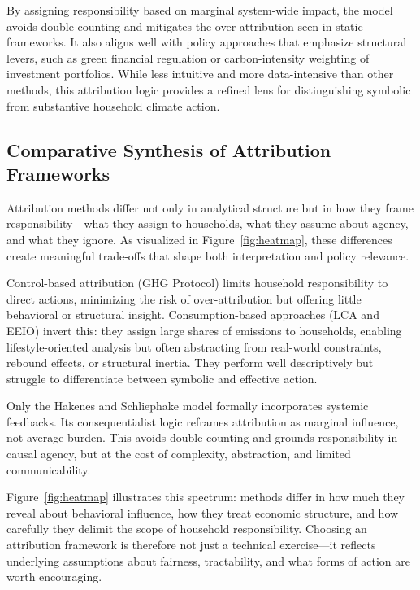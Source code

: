 \documentclass[12pt,a4paper]{article}%
\begin{document}
By assigning responsibility based on marginal system-wide impact, the model avoids double-counting and mitigates the over-attribution seen in static frameworks. It also aligns well with policy approaches that emphasize structural levers, such as green financial regulation or carbon-intensity weighting of investment portfolios. While less intuitive and more data-intensive than other methods, this attribution logic provides a refined lens for distinguishing symbolic from substantive household climate action.

\subsection{Comparative Synthesis of Attribution Frameworks}

Attribution methods differ not only in analytical structure but in how they frame responsibility—what they assign to households, what they assume about agency, and what they ignore. As visualized in Figure~\ref{fig:heatmap}, these differences create meaningful trade-offs that shape both interpretation and policy relevance.

Control-based attribution (GHG Protocol) limits household responsibility to direct actions, minimizing the risk of over-attribution but offering little behavioral or structural insight. Consumption-based approaches (LCA and EEIO) invert this: they assign large shares of emissions to households, enabling lifestyle-oriented analysis but often abstracting from real-world constraints, rebound effects, or structural inertia. They perform well descriptively but struggle to differentiate between symbolic and effective action.

Only the Hakenes and Schliephake model formally incorporates systemic feedbacks. Its consequentialist logic reframes attribution as marginal influence, not average burden. This avoids double-counting and grounds responsibility in causal agency, but at the cost of complexity, abstraction, and limited communicability.

Figure~\ref{fig:heatmap} illustrates this spectrum: methods differ in how much they reveal about behavioral influence, how they treat economic structure, and how carefully they delimit the scope of household responsibility. Choosing an attribution framework is therefore not just a technical exercise—it reflects underlying assumptions about fairness, tractability, and what forms of action are worth encouraging.
\end{document}
